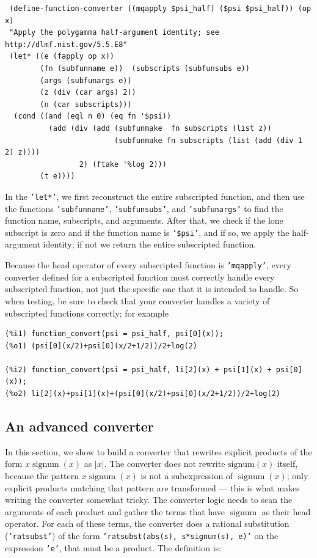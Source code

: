 \documentclass[12pt,fleqn]{extarticle}
\newcommand{\ttq}[1]{\texttt{'#1'}}
\newenvironment{maximabox}
  {\begin{tcolorbox}[
      breakable,
      enhanced,
      colback=white,
      colframe=black!8,
      boxrule=0pt,
      borderline west={2.2pt}{0pt}{black!25},
      arc=1pt,
      left=11pt,
      right=7pt,
      top=9pt,
      bottom=9pt,
      before skip=14pt,
      after skip=14pt
    ]}
  {\end{tcolorbox}}
\DeclareMathOperator{\signum}{signum}
\begin{document}
 \begin{maximabox}
 \begin{verbatim}
 (define-function-converter ((mqapply $psi_half) ($psi $psi_half)) (op x)
 "Apply the polygamma half-argument identity; see http://dlmf.nist.gov/5.5.E8"
 (let* ((e (fapply op x)) 
        (fn (subfunname e))  (subscripts (subfunsubs e)) 
        (args (subfunargs e)) 
        (z (div (car args) 2)) 
        (n (car subscripts)))
  (cond ((and (eql n 0) (eq fn '$psi))
          (add (div (add (subfunmake  fn subscripts (list z))
                         (subfunmake fn subscripts (list (add (div 1 2) z))))
                 2) (ftake '%log 2)))
        (t e))))
   \end{verbatim}
 \end{maximabox}
In the \ttq{let*}, we first reconstruct the entire subscripted function, and then use
the functions \ttq{subfunname}, \ttq{subfunsubs}, and \ttq{subfunargs} to find the function name,
subscripts, and arguments.  After that, we check if the lone subscript is zero and if
the function name is \ttq{\$psi}, and if so, we
apply the half-argument identity; if not we return the entire subscripted function. 

Because the head operator of every subscripted function is \ttq{mqapply}, every converter
defined for a subscripted function must correctly handle every subscripted function, not just
the specific one that it is intended to handle. So when testing, be sure to check that your
converter handles a variety of subscripted functions correctly; for example
\begin{maximabox}
\begin{verbatim}
(%i1) function_convert(psi = psi_half, psi[0](x));
(%o1) (psi[0](x/2)+psi[0](x/2+1/2))/2+log(2)

(%i2) function_convert(psi = psi_half, li[2](x) + psi[1](x) + psi[0](x));
(%o2) li[2](x)+psi[1](x)+(psi[0](x/2)+psi[0](x/2+1/2))/2+log(2)
\end{verbatim}
\end{maximabox}

\subsection{An advanced converter}

In this section, we show to build a converter that rewrites explicit products of the form
$x  \signum(x)$ as $|x|$.   The converter does not rewrite 
\(\mathrm{signum}(x)\) itself, because the pattern \(x \signum(x)\) is 
not a subexpression of \(\signum(x)\); only explicit products matching that pattern
are transformed --- this is what makes writing the converter somewhat tricky.  The converter logic
needs to scan the arguments of each product and gather the terms that have $\signum$
as their head operator.  For each of these terms,  the converter does a rational substitution (\ttq{ratsubst}) of the form \ttq{ratsubst(abs(s), s*signum(s), e)} on the expression \ttq{e},
that must be a product. The definition is:
\end{document}
